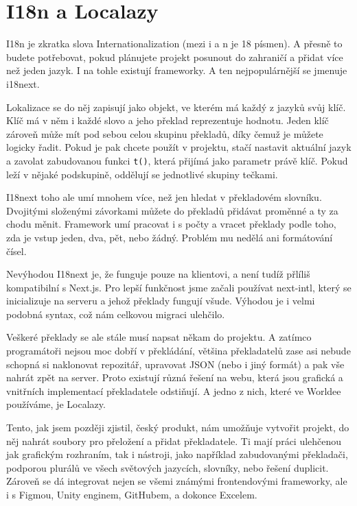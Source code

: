 \section{I18n a Localazy}

I18n je zkratka slova Internationalization (mezi i a n je 18 písmen)\cite{I18nMeaning}. A přesně to budete potřebovat, pokud plánujete projekt posunout do zahraničí a přidat více než jeden jazyk. I na tohle existují frameworky. A ten nejpopulárnější se jmenuje i18next\cite{I18nextDocs}.

Lokalizace se do něj zapisují jako objekt, ve kterém má každý z jazyků svůj klíč. Klíč má v něm i každé slovo a jeho překlad reprezentuje hodnotu. Jeden klíč zároveň může mít pod sebou celou skupinu překladů, díky čemuž je můžete logicky řadit. Pokud je pak chcete použít v projektu, stačí nastavit aktuální jazyk a zavolat zabudovanou funkci \texttt{t()}, která přijímá jako parametr právě klíč. Pokud leží v nějaké podskupině, oddělují se jednotlivé skupiny tečkami.

I18next toho ale umí mnohem více, než jen hledat v překladovém slovníku\cite{I18nextVideo}. Dvojitými složenými závorkami můžete do překladů přidávat proměnné a ty za chodu měnit. Framework umí pracovat i s počty a vracet překlady podle toho, zda je vstup jeden, dva, pět, nebo žádný. Problém mu nedělá ani formátování čísel.

Nevýhodou I18next je, že funguje pouze na klientovi, a není tudíž přlíliš kompatibilní s Next.js. Pro lepší funkčnost jsme začali používat next-intl, který se inicializuje na serveru a jehož překlady fungují všude. Výhodou je i velmi podobná syntax, což nám celkovou migraci ulehčilo.

Veškeré překlady se ale stále musí napsat někam do projektu. A zatímco programátoři nejsou moc dobří v překládání, většina překladatelů zase asi nebude schopná si naklonovat repozitář, upravovat JSON (nebo i jiný formát) a pak vše nahrát zpět na server. Proto existují různá řešení na webu, která jsou grafická a vnitřních implementací překladatele odstiňují. A jedno z nich, které ve Worldee používáme, je Localazy.

Tento, jak jsem později zjistil, český produkt, nám umožňuje vytvořit projekt, do něj nahrát soubory pro přeložení a přidat překladatele. Ti mají práci ulehčenou jak grafickým rozhraním, tak i nástroji, jako například zabudovanými překladači, podporou plurálů ve všech světových jazycích, slovníky, nebo řešení duplicit\cite{LocalazyPricing}. Zároveň se dá integrovat nejen se všemi známými frontendovými frameworky, ale i s Figmou, Unity enginem, GitHubem, a dokonce Excelem\cite{LocalazyIntegration}.